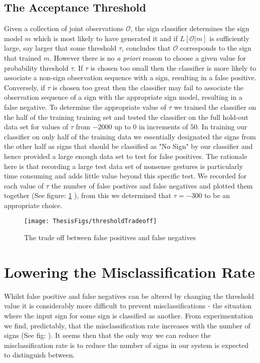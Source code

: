 \subsection{The Acceptance Threshold}
Given a collection of joint observations $\mathcal{O}$, the sign classifier determines the sign model $m$ which is most likely to have generated it and if $L[\mathcal{O}|m]$ is sufficiently large, say larger that some threshold $\tau$, concludes that $\mathcal{O}$ corresponds to the sign that trained $m$. However there is no \emph{a priori} reason to choose a given value for probability threshold $\tau$. If $\tau$ is chosen too small then the classifier is more likely to associate a non-sign observation sequence with a sign, resulting in a false positive. Conversely, if $\tau$ is chosen too great then the classifier may fail to associate the observation sequence of a sign with the appropriate sign model, resulting in a false negative. To determine the appropriate value of $\tau$ we trained the classifier on the half of the training training set and tested the classifier on the full hold-out data set for values of $\tau$ from $-2000$ up to $0$ in increments of $50$. In training our classifier on only half of the training data we essentially designated the signs from the other half as signs that should be classified as "No Sign" by our classifier and hence provided a large enough data set to test for false positives. The rationale here is that recording a large test data set of nonsense gestures is particularly time consuming and adds little value beyond this specific test. We recorded for each value of $\tau$ the number of false postives and false negatives and plotted them together (See figure: \ref{fig:misclassTest} ), from this we determined that $\tau = -300$ to be an appropriate choice. 


\begin{figure}[]
        \centering
        \texttt{[image: ThesisFigs/thresholdTradeoff]}
        \caption{The trade off between false positives and false negatives}\label{fig:misclassTest}
\end{figure}

\section{Lowering the Misclassification Rate}
Whilst false positive and false negatives can be altered by changing the threshold value it is considerably more difficult to prevent misclassifications - the situation where the input sign for some sign is classified as another. From experimentation we find, predictably, that the misclassification rate increases with the number of signs (See fig: ). It seems then that the only way we can reduce the misclassification rate is to reduce the number of signs in our system is expected to distinguish between.


